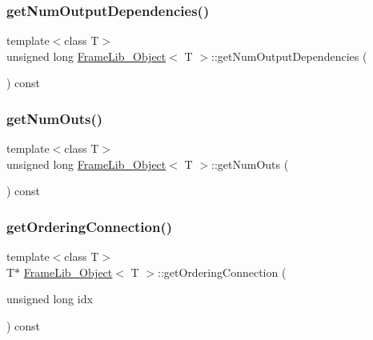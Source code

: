 \mbox{\label{class_frame_lib___object_a80ca53cc96b35c672b82d175840da496}} 
\subsubsection{\texorpdfstring{get\+Num\+Output\+Dependencies()}{getNumOutputDependencies()}}
{\footnotesize\ttfamily template$<$class T$>$ \\
unsigned long \hyperlink{class_frame_lib___object}{Frame\+Lib\+\_\+\+Object}$<$ T $>$\+::get\+Num\+Output\+Dependencies (\begin{DoxyParamCaption}{ }\end{DoxyParamCaption}) const\hspace{0.3cm}{\ttfamily [inline]}}

\mbox{\label{class_frame_lib___object_a255f6ae814dbb946d445ef244dd39975}} 
\subsubsection{\texorpdfstring{get\+Num\+Outs()}{getNumOuts()}}
{\footnotesize\ttfamily template$<$class T$>$ \\
unsigned long \hyperlink{class_frame_lib___object}{Frame\+Lib\+\_\+\+Object}$<$ T $>$\+::get\+Num\+Outs (\begin{DoxyParamCaption}{ }\end{DoxyParamCaption}) const\hspace{0.3cm}{\ttfamily [inline]}}

\mbox{\label{class_frame_lib___object_a6a368084d4df3cfe02487d47e436a125}} 
\subsubsection{\texorpdfstring{get\+Ordering\+Connection()}{getOrderingConnection()}}
{\footnotesize\ttfamily template$<$class T$>$ \\
T$\ast$ \hyperlink{class_frame_lib___object}{Frame\+Lib\+\_\+\+Object}$<$ T $>$\+::get\+Ordering\+Connection (\begin{DoxyParamCaption}\item[{unsigned long}]{idx }\end{DoxyParamCaption}) const\hspace{0.3cm}{\ttfamily [inline]}}

